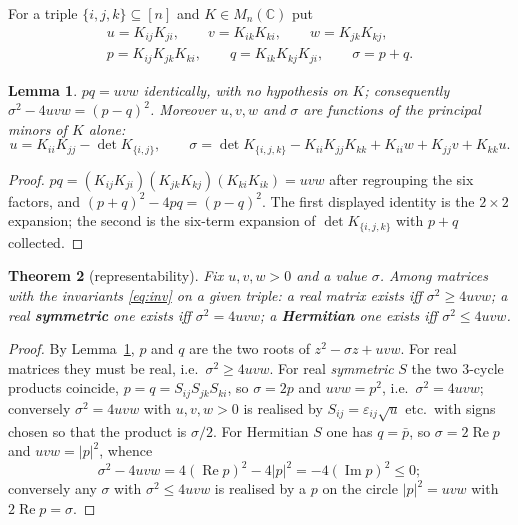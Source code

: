 \documentclass[11pt]{amsart}
\newtheorem{theorem}{Theorem}
\newtheorem{lemma}[theorem]{Lemma}
\theoremstyle{remark}
\newcommand{\bbC}{\mathbb C}
\begin{document}
For a triple $\{i,j,k\}\subseteq[n]$ and $K\in M_{n}(\bbC)$ put
\begin{equation}\label{eq:inv}
\begin{gathered}
 u=K_{ij}K_{ji},\qquad v=K_{ik}K_{ki},\qquad w=K_{jk}K_{kj},\\
 p=K_{ij}K_{jk}K_{ki},\qquad q=K_{ik}K_{kj}K_{ji},\qquad \sigma=p+q.
\end{gathered}
\end{equation}

\begin{lemma}\label{lem:pq}
$pq=uvw$ identically, with no hypothesis on $K$; consequently
$\sigma^{2}-4uvw=(p-q)^{2}$. Moreover $u,v,w$ and $\sigma$ are functions of the principal
minors of $K$ alone:
\[
 u=K_{ii}K_{jj}-\det K_{\{i,j\}},\qquad
 \sigma=\det K_{\{i,j,k\}}-K_{ii}K_{jj}K_{kk}+K_{ii}w+K_{jj}v+K_{kk}u .
\]
\end{lemma}

\begin{proof}
$pq=(K_{ij}K_{ji})(K_{jk}K_{kj})(K_{ki}K_{ik})=uvw$ after regrouping the six factors, and
$(p+q)^{2}-4pq=(p-q)^{2}$. The first displayed identity is the $2\times2$ expansion; the
second is the six-term expansion of $\det K_{\{i,j,k\}}$ with $p+q$ collected.
\end{proof}

\begin{theorem}[representability]\label{thm:A}
Fix $u,v,w>0$ and a value $\sigma$. Among matrices with the invariants \eqref{eq:inv} on a
given triple:
a real matrix exists iff $\sigma^{2}\ge4uvw$; a real \textbf{symmetric} one exists iff
$\sigma^{2}=4uvw$; a \textbf{Hermitian} one exists iff $\sigma^{2}\le4uvw$.
\end{theorem}

\begin{proof}
By Lemma~\ref{lem:pq}, $p$ and $q$ are the two roots of $z^{2}-\sigma z+uvw$. For real
matrices they must be real, i.e.\ $\sigma^{2}\ge4uvw$. For real \emph{symmetric} $S$ the two
$3$-cycle products coincide, $p=q=S_{ij}S_{jk}S_{ki}$, so $\sigma=2p$ and $uvw=p^{2}$, i.e.\
$\sigma^{2}=4uvw$; conversely $\sigma^{2}=4uvw$ with $u,v,w>0$ is realised by
$S_{ij}=\varepsilon_{ij}\sqrt u$ etc.\ with signs chosen so that the product is
$\sigma/2$. For Hermitian $S$ one has $q=\bar p$, so $\sigma=2\operatorname{Re}p$ and
$uvw=|p|^{2}$, whence
\begin{equation}\label{eq:herm}
 \sigma^{2}-4uvw=4(\operatorname{Re}p)^{2}-4|p|^{2}=-4(\operatorname{Im}p)^{2}\le0;
\end{equation}
conversely any $\sigma$ with $\sigma^{2}\le4uvw$ is realised by a $p$ on the circle
$|p|^{2}=uvw$ with $2\operatorname{Re}p=\sigma$.
\end{proof}
\end{document}
